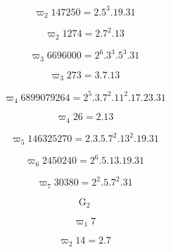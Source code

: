\[
\varpi_ {2} 147250 = 2.5 ^ {3}.19.31
\]

\[
\varpi_ {2} 1274 = 2.7 ^ {2}.13
\]

\[
\varpi_ {3} 6696000 = 2 ^ {6}.3 ^ {3}.5 ^ {3}.31
\]

\[
\varpi_ {3} 273 = 3.7.13
\]

\[
\varpi_ {4} 6899079264 = 2 ^ {5}.3.7 ^ {2}.11 ^ {2}.17.23.31
\]

\[
\varpi_ {4} 26 = 2.13
\]

\[
\varpi_ {5} 146325270 = 2.3.5.7 ^ {2}.13 ^ {2}.19.31
\]

\[
\varpi_ {6} 2450240 = 2 ^ {6}.5.13.19.31
\]

\[
\varpi_ {7} 30380 = 2 ^ {2}.5.7 ^ {2}.31
\]

\[
\mathrm{G} _ {2}
\]

\[
\varpi_ {1} 7
\]

\[
\varpi_ {2} 14 = 2.7
\]

